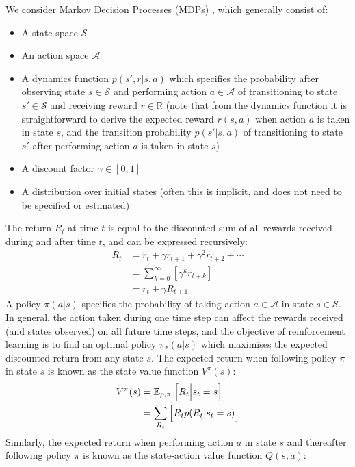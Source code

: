 We consider Markov Decision Processes (MDPs) \cite{sutton2018reinforcement}, which generally consist of:
\begin{itemize}
    \item A state space $\mathcal{S}$
    \item An action space $\mathcal{A}$
    \item A dynamics function $p(s', r \vert s, a)$ which specifies the probability after observing state $s\in\mathcal{S}$ and performing action $a\in\mathcal{A}$ of transitioning to state $s'\in\mathcal{S}$ and receiving reward $r\in\mathbb{R}$ (note that from the dynamics function it is straightforward to derive the expected reward $r(s, a)$ when action $a$ is taken in state $s$, and the transition probability $p(s'\vert s, a)$ of transitioning to state $s'$ after performing action $a$ is taken in state $s$)
    \item A discount factor $\gamma\in[0, 1]$
    \item A distribution over initial states (often this is implicit, and does not need to be specified or estimated)
\end{itemize}
The return $R_t$ at time $t$ is equal to the discounted sum of all rewards received during and after time $t$, and can be expressed recursively:
\begin{align*}
    R_t &= r_t + \gamma r_{t+1} + \gamma^2 r_{t+2} + \cdots \\
    &= \sum_{k = 0}^\infty{\left[ \gamma^k r_{t+k} \right]} \\
    &= r_t + \gamma R_{t+1}
\end{align*}
A policy $\pi(a\vert s)$ specifies the probability of taking action $a\in\mathcal{A}$ in state $s\in\mathcal{S}$. In general, the action taken during one time step can affect the rewards received (and states observed) on all future time steps, and the objective of reinforcement learning is to find an optimal policy $\pi_*(a\vert s)$ which maximises the expected discounted return from any state $s$. The expected return when following policy $\pi$ in state $s$ is known as the state value function $V^\pi(s)$:
\begin{align*}
    V^\pi(s) &= \mathbb{E}_{p, \pi} \left.\Bigl[ R_t \middle\vert s_t=s \Bigr]\right. \\
    &= \sum_{R_t}{\Bigl[ R_t p(R_t\vert s_t=s) \Bigr]}
\end{align*}
Similarly, the expected return when performing action $a$ in state $s$ and thereafter following policy $\pi$ is known as the state-action value function $Q(s, a)$:

